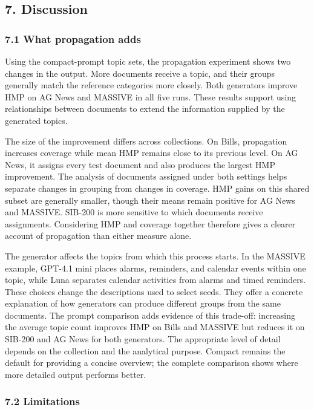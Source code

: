 \documentclass[
  11pt,
  a4paper,
]{article}
\begin{document}
\subsection{7. Discussion}\label{discussion}

\subsubsection{7.1 What propagation adds}\label{what-propagation-adds}

Using the compact-prompt topic sets, the propagation experiment shows
two changes in the output. More documents receive a topic, and their
groups generally match the reference categories more closely. Both
generators improve HMP on AG News and MASSIVE in all five runs. These
results support using relationships between documents to extend the
information supplied by the generated topics.

The size of the improvement differs across collections. On Bills,
propagation increases coverage while mean HMP remains close to its
previous level. On AG News, it assigns every test document and also
produces the largest HMP improvement. The analysis of documents assigned
under both settings helps separate changes in grouping from changes in
coverage. HMP gains on this shared subset are generally smaller, though
their means remain positive for AG News and MASSIVE. SIB-200 is more
sensitive to which documents receive assignments. Considering HMP and
coverage together therefore gives a clearer account of propagation than
either measure alone.

The generator affects the topics from which this process starts. In the
MASSIVE example, GPT-4.1 mini places alarms, reminders, and calendar
events within one topic, while Luna separates calendar activities from
alarms and timed reminders. These choices change the descriptions used
to select seeds. They offer a concrete explanation of how generators can
produce different groups from the same documents. The prompt comparison
adds evidence of this trade-off: increasing the average topic count
improves HMP on Bills and MASSIVE but reduces it on SIB-200 and AG News
for both generators. The appropriate level of detail depends on the
collection and the analytical purpose. Compact remains the default for
providing a concise overview; the complete comparison shows where more
detailed output performs better.

\subsubsection{7.2 Limitations}\label{limitations}
\end{document}
